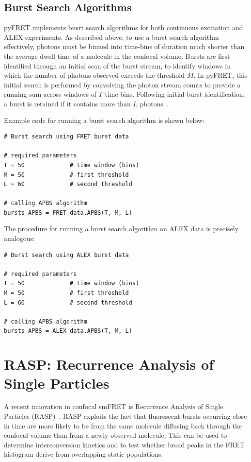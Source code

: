 \subsection{Burst Search Algorithms}
pyFRET implements busrt search algorithms for both continuous excitation and ALEX experiments. As described above, to use a burst search algorithm effectively, photons must be binned into time-bins of duration much shorter than the average dwell time of a molecule in the confocal volume. Bursts are first identified through an initial scan of the burst stream, to identify windows in which the number of photons observed exceeds the threshold $M$. In pyFRET, this initial search is performed by convolving the photon stream counts to provide a running sum across windows of $T$ time-bins. Following initial burst identification, a burst is retained if it contains more than $L$ photons~\cite{nir06}.

Example code for running a burst search algorithm is shown below:

\begin{lstlisting}
# Burst search using FRET burst data

# required parameters
T = 50             # time window (bins)
M = 50             # first threshold
L = 60             # second threshold

# calling APBS algorithm
bursts_APBS = FRET_data.APBS(T, M, L)
\end{lstlisting}

The procedure for running a burst search algorithm on ALEX data is precisely analogous:

\begin{lstlisting}
# Burst search using ALEX burst data

# required parameters
T = 50             # time window (bins)
M = 50             # first threshold
L = 60             # second threshold

# calling APBS algorithm
bursts_APBS = ALEX_data.APBS(T, M, L)
\end{lstlisting}

\section{RASP: Recurrence Analysis of Single Particles}
A recent innovation in confocal smFRET is Recurrence Analysis of Single Particles (RASP)~\cite{hoffmann11}. RASP exploits the fact that fluorescent bursts occurring close in time are more likely to be from the same molecule diffusing back through the confocal volume than from a newly observed molecule. This can be used to determine interconversion kinetics and to test whether broad peaks in the FRET histogram derive from overlapping static populations.


